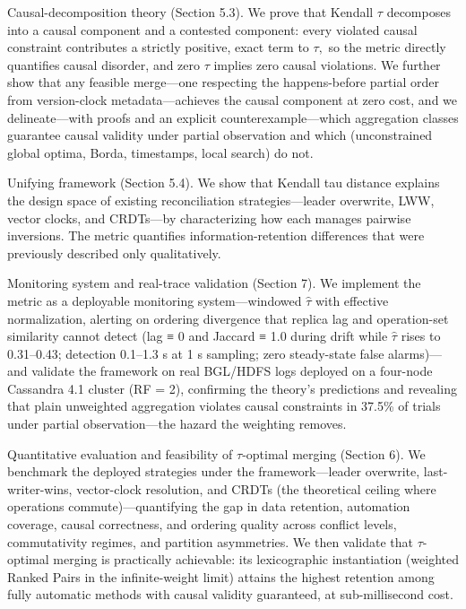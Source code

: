\documentclass[10pt,twocolumn]{article}
\begin{document}
Causal-decomposition theory (Section 5.3). We prove that Kendall $\tau$ decomposes into a causal component and a contested component: every violated causal constraint contributes a strictly positive, exact term to $\tau,$ so the metric directly quantifies causal disorder, and zero $\tau$ implies zero causal violations. We further show that any feasible merge—one respecting the happens-before partial order from version-clock metadata—achieves the causal component at zero cost, and we delineate—with proofs and an explicit counterexample—which aggregation classes guarantee causal validity under partial observation and which (unconstrained global optima, Borda, timestamps, local search) do not.

Unifying framework (Section 5.4). We show that Kendall tau distance explains the design space of existing reconciliation strategies—leader overwrite, LWW, vector clocks, and CRDTs—by characterizing how each manages pairwise inversions. The metric quantifies information-retention differences that were previously described only qualitatively.

Monitoring system and real-trace validation (Section 7). We implement the metric as a deployable monitoring system—windowed $\hat{\tau}$ with effective normalization, alerting on ordering divergence that replica lag and operation-set similarity cannot detect (lag ≡ 0 and Jaccard ≡ 1.0 during drift while $\hat{\tau}$ rises to 0.31–0.43; detection 0.1–1.3 s at 1 s sampling; zero steady-state false alarms)—and validate the framework on real BGL/HDFS logs deployed on a four-node Cassandra 4.1 cluster (RF = 2), confirming the theory's predictions and revealing that plain unweighted aggregation violates causal constraints in 37.5\% of trials under partial observation—the hazard the weighting removes.

Quantitative evaluation and feasibility of $\tau$-optimal merging (Section 6). We benchmark the deployed strategies under the framework—leader overwrite, last-writer-wins, vector-clock resolution, and CRDTs (the theoretical ceiling where operations commute)—quantifying the gap in data retention, automation coverage, causal correctness, and ordering quality across conflict levels, commutativity regimes, and partition asymmetries. We then validate that $\tau$-optimal merging is practically achievable: its lexicographic instantiation (weighted Ranked Pairs in the infinite-weight limit) attains the highest retention among fully automatic methods with causal validity guaranteed, at sub-millisecond cost.
\end{document}
